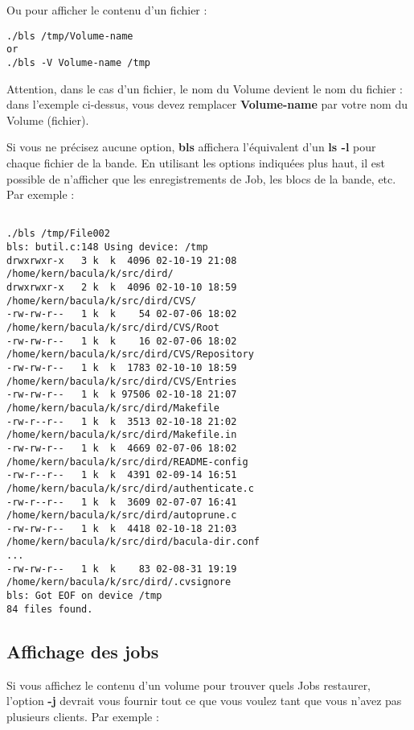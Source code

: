 Ou pour afficher le contenu d'un fichier :

\footnotesize
\begin{verbatim}
./bls /tmp/Volume-name
or
./bls -V Volume-name /tmp
\end{verbatim}
\normalsize

Attention, dans le cas d'un fichier, le nom du Volume devient le nom du 
fichier : dans l'exemple ci-dessus, vous devez remplacer {\bf Volume-name} par
votre nom du Volume (fichier). 

Si vous ne précisez aucune option, {\bf bls} affichera l'équivalent d'un 
{\bf ls -l} pour chaque fichier de la bande. En utilisant les options
indiquées plus haut, il est possible de n'afficher que les enregistrements
de Job, les blocs de la bande, etc.
Par exemple :

\footnotesize
\begin{verbatim}
 
./bls /tmp/File002
bls: butil.c:148 Using device: /tmp
drwxrwxr-x   3 k  k  4096 02-10-19 21:08  /home/kern/bacula/k/src/dird/
drwxrwxr-x   2 k  k  4096 02-10-10 18:59  /home/kern/bacula/k/src/dird/CVS/
-rw-rw-r--   1 k  k    54 02-07-06 18:02  /home/kern/bacula/k/src/dird/CVS/Root
-rw-rw-r--   1 k  k    16 02-07-06 18:02  /home/kern/bacula/k/src/dird/CVS/Repository
-rw-rw-r--   1 k  k  1783 02-10-10 18:59  /home/kern/bacula/k/src/dird/CVS/Entries
-rw-rw-r--   1 k  k 97506 02-10-18 21:07  /home/kern/bacula/k/src/dird/Makefile
-rw-r--r--   1 k  k  3513 02-10-18 21:02  /home/kern/bacula/k/src/dird/Makefile.in
-rw-rw-r--   1 k  k  4669 02-07-06 18:02  /home/kern/bacula/k/src/dird/README-config
-rw-r--r--   1 k  k  4391 02-09-14 16:51  /home/kern/bacula/k/src/dird/authenticate.c
-rw-r--r--   1 k  k  3609 02-07-07 16:41  /home/kern/bacula/k/src/dird/autoprune.c
-rw-rw-r--   1 k  k  4418 02-10-18 21:03  /home/kern/bacula/k/src/dird/bacula-dir.conf
...
-rw-rw-r--   1 k  k    83 02-08-31 19:19  /home/kern/bacula/k/src/dird/.cvsignore
bls: Got EOF on device /tmp
84 files found.
\end{verbatim}
\normalsize

\subsection{Affichage des jobs}

Si vous affichez le contenu d'un volume pour trouver quels Jobs restaurer, 
l'option {\bf -j} devrait vous fournir tout ce que vous voulez tant que vous
n'avez pas plusieurs clients. Par exemple :

